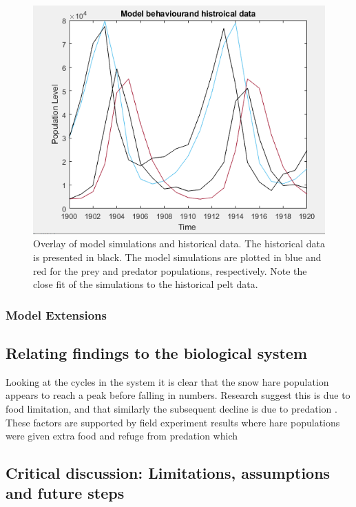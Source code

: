 \documentclass{article}
\begin{document}
\begin{figure}[H]
    \includegraphics[width = \textwidth]{results_3.PNG}
    \caption{Overlay of model simulations and historical data. The historical data is presented in black. The model simulations are plotted in blue and red for the prey and predator populations, respectively. Note the close fit of the simulations to the historical pelt data.}
    \label{fig:results_3}
\end{figure}

\subsubsection{Model Extensions}

 
\subsection{Relating findings to the biological system}

Looking at the cycles in the system it is clear that the snow hare population appears to reach a peak before falling in numbers. Research suggest this is due to food limitation, and that similarly the subsequent decline is due to predation \parencite{king_geometry_2001}. These factors are supported by field experiment results where hare populations were given extra food and refuge from predation which 


\subsection{Critical discussion: Limitations, assumptions and future steps}
\end{document}
